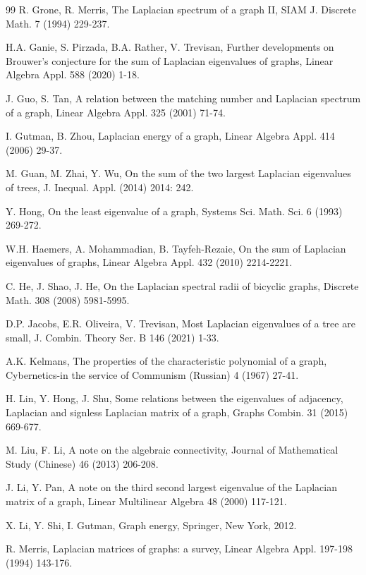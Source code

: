\documentclass[12pt, a4paper]{article}
\begin{document}
{\begin{thebibliography}{99}
 R. Grone, R. Merris, The Laplacian spectrum of a graph II, SIAM J. Discrete Math. 7 (1994) 229-237.%

 H.A. Ganie, S. Pirzada, B.A. Rather, V. Trevisan, Further developments on Brouwer's conjecture for the sum of Laplacian eigenvalues of graphs, Linear Algebra Appl. 588 (2020) 1-18.

 J. Guo, S. Tan, A relation between the matching number and Laplacian spectrum of a graph, Linear Algebra Appl. 325 (2001) 71-74.

 I. Gutman, B. Zhou, Laplacian energy of a graph, Linear Algebra Appl. 414 (2006) 29-37.%

 M. Guan, M. Zhai, Y. Wu, On the sum of the two largest Laplacian eigenvalues of trees, J. Inequal. Appl. (2014) 2014: 242.

 Y. Hong, On the least eigenvalue of a graph, Systems Sci. Math. Sci. 6 (1993) 269-272.

 W.H. Haemers, A. Mohammadian, B. Tayfeh-Rezaie, On the sum of Laplacian eigenvalues of graphs, Linear Algebra Appl. 432 (2010) 2214-2221.

 C. He, J. Shao, J. He, On the Laplacian spectral radii of bicyclic graphs, Discrete Math. 308 (2008) 5981-5995.

 D.P. Jacobs, E.R. Oliveira, V. Trevisan, Most Laplacian eigenvalues of a tree are small, J. Combin. Theory Ser. B 146 (2021) 1-33.

 A.K. Kelmans, The properties of the characteristic polynomial of a graph, Cybernetics-in the service of Communism (Russian) 4 (1967) 27-41.

 H. Lin, Y. Hong, J. Shu, Some relations between the eigenvalues of adjacency, Laplacian and signless Laplacian matrix of a graph, Graphs Combin. 31 (2015) 669-677.

 M. Liu, F. Li, A note on the algebraic connectivity, Journal of Mathematical Study (Chinese) 46 (2013) 206-208.

 J. Li, Y. Pan, A note on the third second largest eigenvalue of the Laplacian matrix of a graph, Linear Multilinear Algebra 48 (2000) 117-121.

 X. Li, Y. Shi, I. Gutman, Graph energy, Springer, New York, 2012.%

 R. Merris, Laplacian matrices of graphs: a survey, Linear Algebra Appl. 197-198 (1994) 143-176.


\end{thebibliography}}
\end{document}
